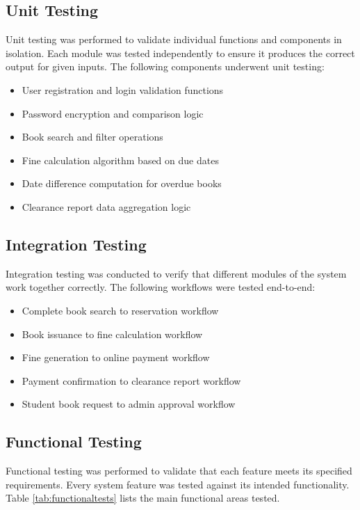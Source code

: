 \documentclass[12pt,a4paper]{report}
\begin{document}
\subsection{Unit Testing}

Unit testing was performed to validate individual functions and components in isolation. Each module was tested independently to ensure it produces the correct output for given inputs. The following components underwent unit testing:

\begin{itemize}
    \item User registration and login validation functions
    \item Password encryption and comparison logic
    \item Book search and filter operations
    \item Fine calculation algorithm based on due dates
    \item Date difference computation for overdue books
    \item Clearance report data aggregation logic
\end{itemize}

\subsection{Integration Testing}

Integration testing was conducted to verify that different modules of the system work together correctly. The following workflows were tested end-to-end:

\begin{itemize}
    \item Complete book search to reservation workflow
    \item Book issuance to fine calculation workflow
    \item Fine generation to online payment workflow
    \item Payment confirmation to clearance report workflow
    \item Student book request to admin approval workflow
\end{itemize}

\subsection{Functional Testing}

Functional testing was performed to validate that each feature meets its specified requirements. Every system feature was tested against its intended functionality. Table \ref{tab:functionaltests} lists the main functional areas tested.
\end{document}
